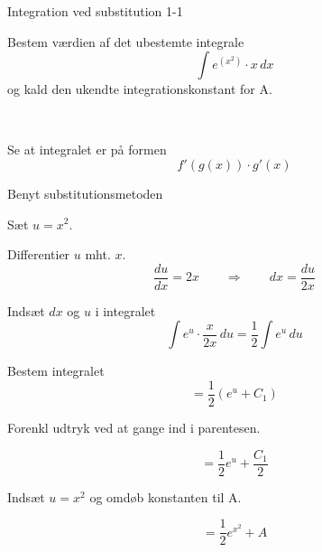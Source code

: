 \documentclass{article}
\begin{document}
\tableofcontents


\begin{exercise}{Integration ved substitution 1-1}
	
	
	Bestem værdien af det ubestemte integrale
	\[
	\int e^{(x^2)} \cdot x \, dx
	\]
	og kald den ukendte integrationskonstant for A.
	
	 \\
	
	
	
	\hint
	
	Se at integralet er på formen
	\[
	f'(g(x)) \cdot g'(x)
	\]
	
	\hint
	
	Benyt substitutionsmetoden
	
	\hint
	
	Sæt $u=x^2$.
	
	
	\hint
	
	Differentier $u$ mht. $x$.
	\[
	\frac{du}{dx} = 2x \qquad	\Rightarrow \qquad dx = \frac{du}{2x}
	\]
	
	\hint
	
	Indsæt $dx$ og $u$ i integralet
	\[
	\int e^{u} \cdot \frac{x}{2x} \, du = \frac{1}{2} \int e^u \, du
	\]
	
	\hint
	
	Bestem integralet
	\[
	= \frac{1}{2} \left( e^u + C_1 \right)
	\]
	
	\hint
	Forenkl udtryk ved at gange ind i parentesen.
	
	\hint
	
	\[
	= \frac{1}{2} e^u + \frac{C_1}{2}
	\]
	
	\hint
	
	Indsæt $u = x^2$ og omdøb konstanten  til A.
	
	\hint
	
	\[
	= \frac{1}{2} e^{x^2} + A
	\]
	
	
\end{exercise}

\newpage
\end{document}
